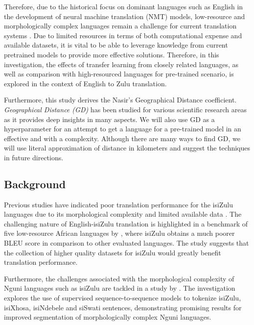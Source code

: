 \documentclass[11pt]{article}
\begin{document}
Therefore, due to the historical focus on dominant languages such as English in the development of neural machine translation (NMT) models, low-resource and morphologically complex languages remain a challenge for current translation systems \citep{haddow2021survey,koehn2017six}. Due to limited resources in terms of both computational expense and available datasets, it is vital to be able to leverage knowledge from current pretrained models to provide more effective solutions. Therefore, in this investigation, the effects of transfer learning from closely related languages, as well as comparison with high-resourced languages for pre-trained scenario, is explored in the context of English to Zulu translation.

Furthermore, this study derives the Nasir's Geographical Distance coefficient. \emph{Geographical Distance (GD)} \citep{holman2007relation} has been studied for various scientific research areas \citep{bei2021motivations,krajsa2011rtt,riginos2001population} as it provides deep insights in many aspects. We will also use GD as a hyperparameter for an attempt to get a language for a pre-trained model in an effective and with a  complexity. Although there are many ways to find GD, we will use literal approximation of distance in kilometers and suggest the techniques in future directions.










\subsection{Background}


Previous studies have indicated poor translation performance for the isiZulu languages due to its morphological complexity and limited available data \citep{martinus2019focus}. The challenging nature of English-isiZulu translation is highlighted in a benchmark of five low-resource African languages by \citet{martinus2019focus}, where isiZulu obtains a much poorer BLEU score in comparison to other evaluated languages. The study suggests that the collection of higher quality datasets for isiZulu would greatly benefit translation performance. 

Furthermore, the challenges associated with the morphological complexity of Nguni languages such as isiZulu are tackled in a study by \citet{moeng2021canonical}. The investigation explores the use of supervised sequence-to-sequence models to tokenize isiZulu, isiXhosa, isiNdebele and siSwati sentences, demonstrating promising results for improved segmentation of morphologically complex Nguni languages.
\end{document}
